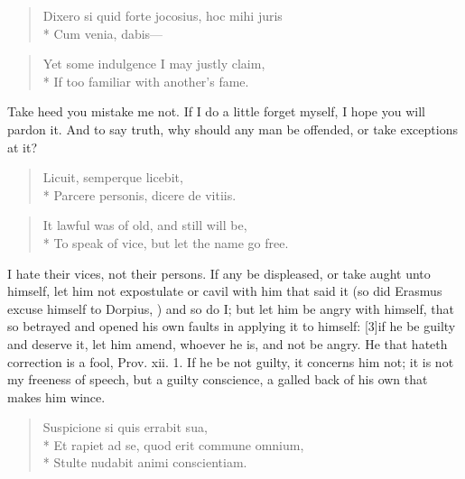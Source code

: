 {\begin{verse}
\textlatin{Dixero si quid forte jocosius, hoc mihi juris}\\*
\textlatin{Cum venia, dabis}---
\end{verse}

\begin{verse}
Yet some indulgence I may justly claim,\\*
If too familiar with another's fame.
\end{verse}

Take heed you mistake me not. If I do a little forget myself, I hope
you will pardon it. And to say truth, why should any man be offended,
or take exceptions at it?

\begin{verse}
\textlatin{Licuit, semperque licebit,}\\*
\textlatin{Parcere personis, dicere de vitiis.}
\end{verse}

\begin{verse}
It lawful was of old, and still will be,\\*
To speak of vice, but let the name go free.
\end{verse}

I hate their vices, not their persons. If any be displeased, or take
aught unto himself, let him not expostulate or cavil with him that said
it (so did Erasmus excuse himself to Dorpius, ) and so do I; but let him be angry with himself, that
so betrayed and opened his own faults in applying it to himself:
[3\baselineskip]if he be guilty and deserve it, let him amend, whoever he is, and
not be angry. He that hateth correction is a fool, Prov. xii. 1. If he
be not guilty, it concerns him not; it is not my freeness of speech,
but a guilty conscience, a galled back of his own that makes him wince.

\begin{verse}
\textlatin{Suspicione si quis errabit sua,}\\*
\textlatin{Et rapiet ad se, quod erit commune omnium,}\\*
\textlatin{Stulte nudabit animi conscientiam.}
\end{verse}

}
